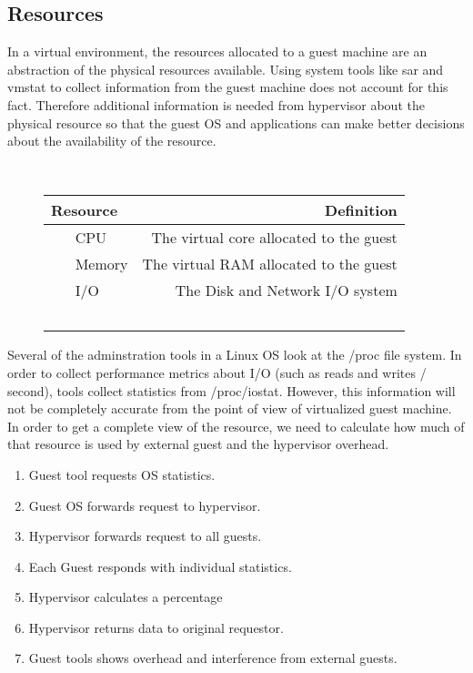 \subsection{Resources}
In a virtual environment, the resources allocated to a guest machine are an abstraction of the physical resources available.  Using system tools like sar and vmstat to collect information from the guest machine does not account for this fact.  Therefore additional information is needed from hypervisor about the physical resource so that the guest OS and applications can make better decisions about the availability of the resource. 
\begin{figure}
  \begin{tabular}{ l | r }
    Resource & Definition \\
    \hline
    CPU & The virtual core allocated to the guest \\ \hline
    Memory & The virtual RAM allocated to the guest \\ \hline
    I/O & The Disk and Network I/O system \\ \hline
  \end{tabular}
\label{fig:resources}
\end{figure}
Several of the adminstration tools in a Linux OS look at the /proc file system.  In order to collect performance metrics about I/O (such as reads and writes / second), tools collect statistics from /proc/iostat\cite{iostats}.  However, this information will not be completely accurate from the point of view of virtualized guest machine. In order to get a complete view of the resource, we need to calculate how much of that resource is used by external guest and the hypervisor overhead.
\begin{enumerate}
	\item Guest tool requests OS statistics.
	\item Guest OS forwards request to hypervisor.
	\item Hypervisor forwards request to all guests.
	\item Each Guest responds with individual statistics.
	\item Hypervisor calculates a percentage 
	\item Hypervisor returns data to original requestor.
	\item Guest tools shows overhead and interference from external guests.
\end{enumerate}

